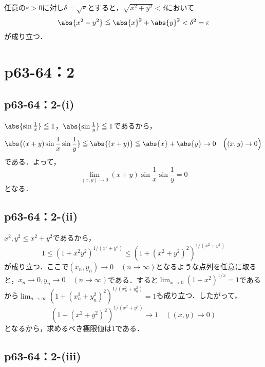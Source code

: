 \documentclass[a4paper,10pt,fleqn]{ltjsarticle}
\begin{document}
  \begin{leftbar}
    任意の$\varepsilon > 0$に対し$\delta = \sqrt{\varepsilon}$とすると，$\sqrt{x^2 + y^2} < \delta$において
    \[
      \abs{x^2-y^2} \leq \abs{x}^2 + \abs{y}^2 < \delta^2 = \varepsilon
    \]
    が成り立つ．
  \end{leftbar}


  
  \section*{p63-64：2}
  

\subsection*{p63-64：2-(i)}

\begin{tleftbar}
    $\abs{\sin \frac{1}{x}} \le 1$，$\abs{\sin \frac{1}{y}} \le 1$であるから，
    \[
        \abs{(x+y) \sin \frac{1}{x} \sin \frac{1}{y}} \le \abs{(x+y)} \le \abs{x}+\abs{y} \to 0 \quad  \Bigl( (x,y) \to 0 \Bigl)
    \]
    である．よって，
    \[
        \lim_{(x,y)\to 0} (x+y) \sin \frac{1}{x} \sin \frac{1}{y} =0
    \]
    となる．
\end{tleftbar}

\subsection*{p63-64：2-(ii)}

  \begin{tleftbar}
    $x^2,y^2 \leq x^2+y^2$であるから，
    \[
      1 \leq (1 + x^2 y^2)^{1/(x^2+y^2)} \leq (1 + (x^2+y^2)^2)^{1/(x^2+y^2)}
    \]
    が成り立つ．ここで$(x_n, y_n) \to 0 \quad (n \to \infty)$となるような点列を任意に取ると，$x_n \to 0, y_n \to 0 \quad (n \to \infty)$である．すると$\lim_{x \to 0} (1+x^2)^{1/x} = 1$であるから$\lim_{n \to \infty} (1 + (x_n^2+y_n^2)^2)^{1/(x_n^2+y_n^2)} = 1$も成り立つ．したがって，
    \[
      (1 + (x^2+y^2)^2)^{1/(x^2+y^2)} \to 1 \quad ((x,y) \to 0)
    \]
    となるから，求めるべき極限値は$1$である．
  \end{tleftbar}


\subsection*{p63-64：2-(iii)}
\end{document}
